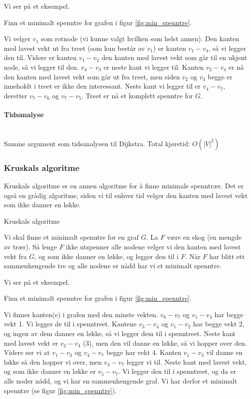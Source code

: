 \noindent Vi ser på et eksempel.

\begin{eks} Finn et minimalt spenntre for grafen i figur \ref{fig:min_spenntre}.

Vi velger $ v_1 $ som rotnode (vi kunne valgt hvilken som helst annen). Den kanten med lavest vekt ut fra treet (som kun består av $ v_1 $) er kanten $ v_1-v_4 $, så vi legger den til. Videre er kanten $ v_1-v_2 $ den kanten med lavest vekt som går til en ukjent node, så vi legger til den. $ v_4-v_3 $ er neste kant vi legger til. Kanten $ v_2-v_4 $ er nå den kanten med lavest vekt som går ut fra treet, men siden $ v_2 $ og $ v_4 $ begge er inneholdt i treet er ikke den interessant. Neste kant vi legger til er $ v_4-v_7 $, deretter $ v_7-v_6 $ og $ v_7-v_5 $. Treet er nå et komplett spenntre for $ G $. 
\end{eks}

\paragraph{Tidsanalyse}~\\
Samme argument som tidsanalysen til Dijkstra. Total kjøretid: $ O\left(|V|^2\right) $


\subsubsection{Kruskals algoritme}
\label{kruskal}

Kruskals algoritme er en annen algoritme for å finne minimale spenntrær. Det er også en grådig algoritme, siden vi til enhver tid velger den kanten med lavest vekt som ikke danner en løkke.

\begin{teorem} Kruskals algoritme

Vi skal finne et minimalt spenntre for en graf $ G $. La $ F $ være en skog (en mengde av trær). Så lenge $ F $ ikke utspenner alle nodene velger vi den kanten med lavest vekt fra $ G $, og som ikke danner en løkke, og legger den til i $ F $. Når $ F $ har blitt ett sammenhengende tre og alle nodene er nådd har vi et minimalt spenntre.
\end{teorem}

\noindent Vi ser på et eksempel.

\begin{eks} Finn et minimalt spenntre for grafen i figur \ref{fig:min_spenntre}.

Vi finner kanten(e) i grafen med den minste vekten. $ v_6-v_7 $ og $ v_1-v_4 $ har begge vekt 1. Vi legger de til i spenntreet. Kantene $ v_3-v_4 $ og $ v_1-v_2 $ har begge vekt 2, og ingen av dem danner en løkke, så vi legger dem til i spenntreet. Neste kant med lavest vekt er $ v_2-v_4 $ (3), men den vil danne en løkke, så vi hopper over den. Videre ser vi at $ v_1-v_3 $ og $ v_4-v_7 $ begge har vekt 4. Kanten $ v_1-v_3 $ vil danne en løkke så den hopper vi over, men $ v_4-v_7 $ legger vi til. Neste kant med lavest vekt, og som ikke danner en løkke er $ v_5-v_7 $. Vi legger den til i spenntreet, og da er alle noder nådd, og vi har en sammenhengende graf. Vi har derfor et minimalt spenntre (se figur \ref{fig:min_spenntre}). 
\end{eks}



